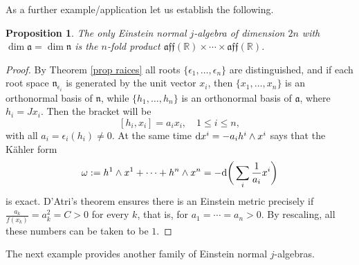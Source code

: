 \documentclass[12pt, twoside]{amsart}
\def\D{\textup{d}}
\def\n{\mathfrak{n}}
\def\a{\mathfrak{a}}
\def\R{\mathbb{R}}
\def\aff{\mathfrak{aff}}
\newtheorem{prop}[definition]{Proposition}
\theoremstyle{definition}
\begin{document}
As a further example/application let us establish the following.
\begin{prop} The only Einstein normal $j$-algebra of dimension $2n$ with $\dim \a=\dim \n$ is the $n$-fold product $\aff(\R)\times \cdots \times \aff(\R)$.
\end{prop}
\begin{proof}
By Theorem \ref{prop raices} all roots $\{\epsilon_{1},\ldots, \epsilon_{n}\}$ are distinguished, and if each root space $\n_{\epsilon_i}$ is generated by the unit vector $x_i$, then $\{x_1, \dots , x_n \}$ is an orthonormal basis of $\n$, while $\{h_1,\ldots, h_n\}$ is an orthonormal basis of $\a$, where $h_i=Jx_i$. 
Then the bracket will be 
\[[h_i, x_i]=a_i x_i, \quad 1\leq i \leq n,\]
with all $a_i = \epsilon_{i}(h_i)\neq 0$. 
At the same time $\D x^{i}=-a_i h^{i}\wedge x^{i}$ says that the K{\"a}hler form 
\[ \omega :=h^{1}\wedge x^{1}+\cdots+h^{n}\wedge x^{n} = 
-\D \bigg( \sum_i \frac{1}{a_i}x^i\bigg)\]
is exact. D'Atri's theorem  ensures there is an Einstein metric precisely if  $\frac{a_k}{f(x_k)}=a_{k}^2=C>0$ for every $k$, that is, for $a_{1}=\cdots=a_{n}>0$. By rescaling, all these numbers can be taken to be $1$. 
\end{proof}

The next example provides another family of Einstein normal $j$-algebras.
\end{document}
